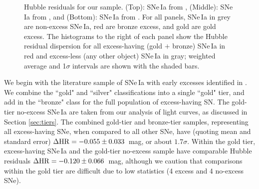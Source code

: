 \documentclass[twocolumn,twocolappendix, linenumbers]{aastex631} %
\begin{document}
\begin{figure}
     \centering
         \hfill
         \hfill
     \hfill
        \caption{Hubble residuals for our sample. (Top): SNe\,Ia from \citet{Burke22b}, (Middle): SNe\,Ia from \citet{Yao19}, and (Bottom): SNe\,Ia from \citet{Dhawan22}. For all panels, SNe\,Ia in grey are non-excess SNe\,Ia, red are bronze excess, and gold are gold excess. The histograms to the right of each panel show the Hubble residual dispersion for all excess-having (gold $+$ bronze) SNe\,Ia in red and excess-less (any other object) SNe\,Ia in gray; weighted average and 1$\sigma$ intervals are shown with the shaded bars.}
        
        
        \label{fig:hubble}
    
\end{figure}

We begin with the literature sample of SNe\,Ia with early excesses identified in \cite{Burke22b}. We combine the \citet{Burke22b} ``gold" and ``silver" classifications into a single ``gold" tier, and add in the \citet{Burke22b} ``bronze" class for the full population of excess-having SN. The gold-tier no-excess SNe\,Ia are taken from our analysis of \cite{Yao19} light curves, as discussed in Section \ref{sec:tiers}. The combined gold-tier and bronze-tier samples, representing all excess-having SNe, when compared to all other SNe, have (quoting mean and standard error)
$\Delta {\rm HR} = -0.055 \pm 0.033$~mag, or about $1.7\sigma$. Within the gold tier, excess-having SNe\,Ia and the gold-tier no-excess sample have comparable Hubble residuals
$\Delta {\rm HR} = -0.120 \pm 0.066$~mag, although we caution that comparisons within the gold tier are difficult due to low statistics (4 excess and 4 no-excess SNe). 
\end{document}
